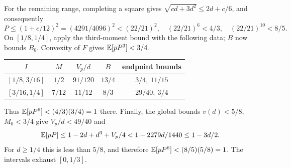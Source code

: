 For the remaining range, completing a square gives
$\sqrt{cd+3d^2}\le2d+c/6$, and consequently
\[
 P\le(1+c/12)^2=(4291/4096)^2<(22/21)^2,
 \quad(22/21)^6<4/3,\quad(22/21)^{10}<8/5.
\]
On $[1/8,1/4]$, apply the third-moment bound with the following data;
$B$ now bounds $B_6$. Convexity of $F$ gives $\mathbb E[pP^3]<3/4$.
\begin{center}
\begin{tabular}{@{}ccccc@{}}
\toprule
$I$ & $M$ & $V_p/d$ & $B$ & endpoint bounds\\\midrule
$[1/8,3/16]$ & $1/2$ & $91/120$ & $13/4$ & $3/4,\ 11/15$\\
$[3/16,1/4]$ & $7/12$ & $11/12$ & $8/3$ & $29/40,\ 3/4$\\
\bottomrule
\end{tabular}
\end{center}
Thus $\mathbb E[pP^6]<(4/3)(3/4)=1$ there. Finally, the global bounds
$v(d)<5/8$, $M_0<3/4$ give $V_p/d<49/40$ and
\[
 \mathbb E[pP]\le1-2d+d^3+V_p/4
 <1-2279d/1440\le1-3d/2.
\]
For $d\ge1/4$ this is less than $5/8$, and therefore
$\mathbb E[pP^6]<(8/5)(5/8)=1$. The intervals exhaust $[0,1/3]$.
